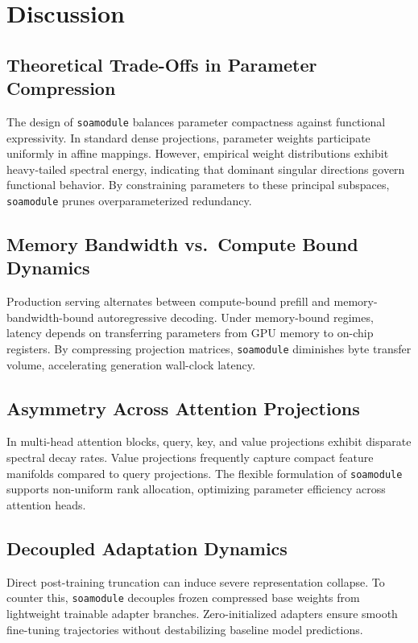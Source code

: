 \section{Discussion}

\subsection{Theoretical Trade-Offs in Parameter Compression}
The design of \texttt{soamodule} balances parameter compactness against functional expressivity. In standard dense projections, parameter weights participate uniformly in affine mappings. However, empirical weight distributions exhibit heavy-tailed spectral energy, indicating that dominant singular directions govern functional behavior. By constraining parameters to these principal subspaces, \texttt{soamodule} prunes overparameterized redundancy.

\subsection{Memory Bandwidth vs.\ Compute Bound Dynamics}
Production serving alternates between compute-bound prefill and memory-bandwidth-bound autoregressive decoding. Under memory-bound regimes, latency depends on transferring parameters from GPU memory to on-chip registers. By compressing projection matrices, \texttt{soamodule} diminishes byte transfer volume, accelerating generation wall-clock latency.

\subsection{Asymmetry Across Attention Projections}
In multi-head attention blocks, query, key, and value projections exhibit disparate spectral decay rates. Value projections frequently capture compact feature manifolds compared to query projections. The flexible formulation of \texttt{soamodule} supports non-uniform rank allocation, optimizing parameter efficiency across attention heads.

\subsection{Decoupled Adaptation Dynamics}
Direct post-training truncation can induce severe representation collapse. To counter this, \texttt{soamodule} decouples frozen compressed base weights from lightweight trainable adapter branches. Zero-initialized adapters ensure smooth fine-tuning trajectories without destabilizing baseline model predictions.

